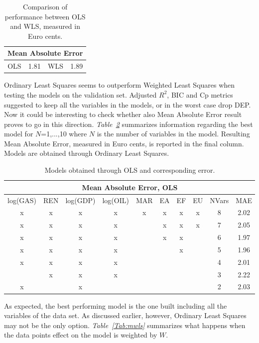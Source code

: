 \documentclass[a4paper,12pt]{book}
\begin{document}
\begin{table}[tb]
\begin{center}
\begin{tabular}{|c|c|c|c|}
\hline
\multicolumn{4}{|c|}{Mean Absolute Error}\\
\hline
OLS&1.81&WLS&1.89\\
\hline
\end{tabular}
\caption{Comparison of performance between OLS and WLS, measured in Euro cents.}
\label{Tab:mae}
\end{center}
\end{table}

Ordinary Least Squares seems to outperform Weighted Least Squares when testing the models on the validation set. Adjusted $R^2$, BIC and Cp metrics suggested to keep all the variables in the models, or in the worst case drop DEP. Now it could be interesting to check whether also Mean Absolute Error result proves to go in this direction. \textit{Table~\ref{Tab:maeols}} summarizes information regarding the best model for $N$=1,...,10 where $N$ is the number of variables in the model. Resulting Mean Absolute Error, measured in Euro cents, is reported in the final column. Models are obtained through Ordinary Least Squares.

\begin{table}[tb]
\begin{center}
\begin{tabular}{|c|c|c|c|c|c|c|c|c|c|}
\hline
\multicolumn{10}{|c|}{Mean Absolute Error, OLS}\\
\hline
log(GAS)&REN&log(GDP)&log(OIL)&MAR&EA&EF&EU&NVars&MAE\\
\hline
x&x&x&x&x&x&x&x&8&2.02\\
x&x&x&x&&x&x&x&7&2.05\\
x&x&x&x&&x&x&&6&1.97\\
x&x&x&x&&&x&&5&1.96\\
x&x&x&x&&&&&4&2.01\\
&x&x&x&&&&&3&2.22\\
x&&x&&&&&&2&2.03\\
\hline
\end{tabular}
\caption{Models obtained through OLS and corresponding error.}
\label{Tab:maeols}
\end{center}
\end{table}

As expected, the best performing model is the one built including all the variables of the data set. As discussed earlier, however, Ordinary Least Squares may not be the only option. \textit{Table~\ref{Tab:mwls}} summarizes what happens when the data points effect on the model is weighted by $W$. 
\end{document}

